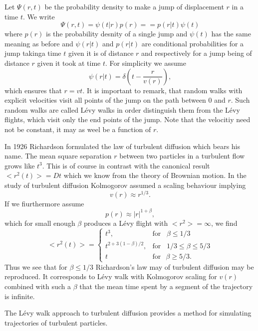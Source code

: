 Let $\Psi(r,t)$ be the probability density to make a jump of displacement $r$
in a time $t$. We write
\begin{displaymath}
  \Psi(r,t) = \psi(t|r) p(r) =
             =  p(r|t) \psi(t)
\end{displaymath}
where $p(r)$ is the probability desnity of a single jump and $\psi(t)$
has the same meaning as before and $\psi(r|t)$ and $p(r|t)$ are conditional
probabilities for a jump takinga time $t$ given it is of distance $r$ and
respectively for a jump being of distance $r$ given it took at time $t$. For
simplicity we assume
\begin{displaymath}
  \psi(r|t) = \delta(t - \frac{r}{v(r)}),
\end{displaymath}
which ensures that $r=vt$. It is important to remark, that random walks with
explicit velocities visit all points of the jump on the path between 0 and
$r$. Such random walks are called L\'evy walks in order distinguish them from
the L\'evy flights, which visit only the end points of the jump. Note that the
velocitiy need not be constant, it may as weel be a function of $r$.

In 1926 Richardson formulated the law of turbulent diffusion 
which bears his name. The mean square separation $r$ between two particles in
a turbulent flow grows like $t^3$. This is of course in contrast with the
canonical result $<r^2(t)> = Dt$ which we know from the theory of Brownian 
motion. In the study of turbulent diffusion Kolmogorov assumed a scaling
behaviour implying
\begin{displaymath}
  v(r) \approx r^{1/3}.
\end{displaymath}
If we fiurthermore assume
\begin{displaymath}
  p(r) \approx |r|^{1+\beta},
\end{displaymath}
which for small enough $\beta$ produces a L\'evy flight with $<r^2> = \infty$,
we find
\begin{displaymath}
  <r^2(t)> = \left\{
              \begin{array}{ll}
                 t^3, & \mbox{for} \;\;\; \beta \le 1/3 \\
                 t^{2 + 3(1-\beta)/2}, & \mbox{for} \;\;\; 
                           1/3 \le \beta \le 5/3 \\
                 t & \mbox{for} \;\;\, \beta \ge 5/3.
               \end{array}
             \right.
\end{displaymath}
Thus we see that for $\beta \le 1/3$ Richardson's law may of turbulent
diffusion may  be reproduced. It corresponds to L\'evy walk with Kolmogorov
scaling for $v(r)$ combined with such a $\beta$ that the mean time spent by a
segment of the trajectory is infinite.

The L\'evy walk approach to turbulent diffusion provides a method for
simulating trajectories of turbulent particles.





